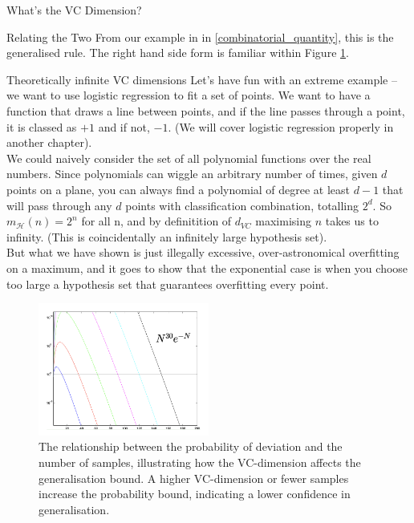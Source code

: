 \begin{commentbox}{What's the VC Dimension?}
\begin{sidenotebox}{Relating the Two}
From our example in in \ref{combinatorial_quantity}, this is the generalised rule. The right hand side form is familiar within Figure \ref{fig:vc_dimension_plot}.
\end{sidenotebox}
\begin{sidenotebox}{Theoretically infinite VC dimensions}
    Let's have fun with an extreme example – we want to use logistic regression to fit a set of points. We want to have a function that draws a line between points, and if the line passes through a point, it is classed as $+1$ and if not, $-1$. (We will cover logistic regression properly in another chapter).\\

    We could naively consider the set of all polynomial functions over the real numbers. Since polynomials can wiggle an arbitrary number of times, given $d$ points on a plane, you can always find a polynomial of degree at least $d-1$ that will pass through any $d$ points with classification combination, totalling $2^d$. So $m_{\mathcal{H}}(n) = 2^n$ for all n, and by definitition of $d_{VC}$ maximising $n$ takes us to infinity. (This is coincidentally an infinitely large hypothesis set).\\

    But what we have shown is just illegally excessive, over-astronomical overfitting on a maximum, and it goes to show that the exponential case is when you choose too large a hypothesis set that guarantees overfitting every point.
\end{sidenotebox}

    
\end{commentbox}


\begin{figure}[H]
    \centering
    \includegraphics[width=0.5\textwidth]{img/vc-plot.png}
    \caption{The relationship between the probability of deviation and the number of samples, illustrating how the VC-dimension affects the generalisation bound. A higher VC-dimension or fewer samples increase the probability bound, indicating a lower confidence in generalisation.}
    \label{fig:vc_dimension_plot}
\end{figure}

